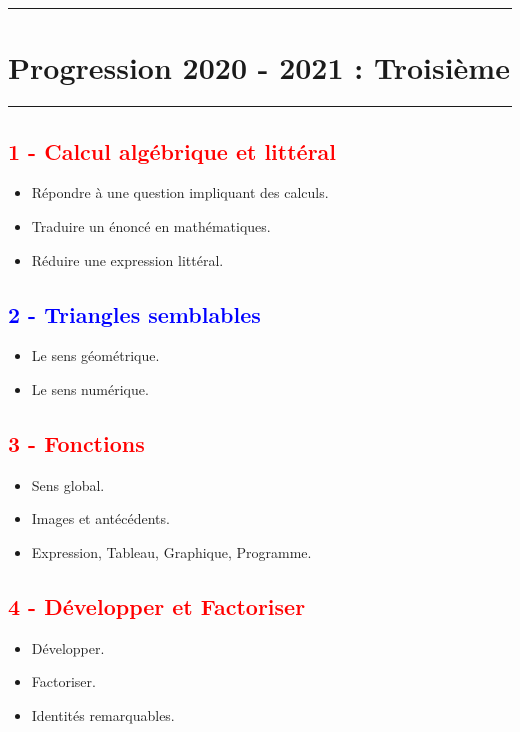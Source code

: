 \documentclass[11pt]{article}
\newcommand{\horrule}[1]{\rule{\linewidth}{#1}} %
\begin{document}
\setlength{\columnseprule}{1pt}

\horrule{2px}
\section*{Progression 2020 - 2021 : Troisième}
\horrule{2px}

\begin{multicols}{2}

\subsection*{\textcolor{red}{1 - Calcul algébrique et littéral}}

\begin{itemize}
\item Répondre à une question impliquant des calculs.
\item Traduire un énoncé en mathématiques.
\item Réduire une expression littéral.
\end{itemize}

\subsection*{\textcolor{blue}{2 - Triangles semblables}}

\begin{itemize}
\item Le sens géométrique.
\item Le sens numérique.
\end{itemize}

\subsection*{\textcolor{red}{3 - Fonctions}}

\begin{itemize}
\item Sens global.
\item Images et antécédents.
\item Expression, Tableau, Graphique, Programme.
\end{itemize}

\subsection*{\textcolor{red}{4 - Développer et Factoriser}}

\begin{itemize}
\item Développer.
\item Factoriser.
\item Identités remarquables.
\end{itemize}


\end{multicols}
\end{document}
